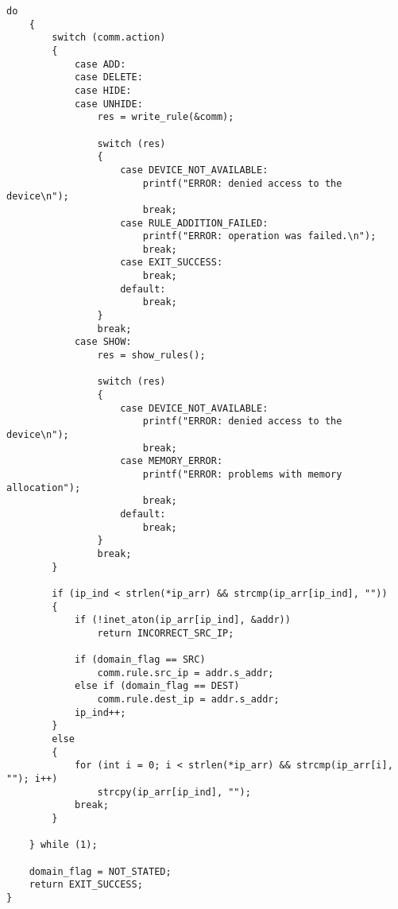 \begin{lstlisting}[caption = {fw.c}]
	do
	{	
		switch (comm.action)
		{
			case ADD:
			case DELETE:
			case HIDE:
			case UNHIDE:
				res = write_rule(&comm);
				
				switch (res)
				{
					case DEVICE_NOT_AVAILABLE:
						printf("ERROR: denied access to the device\n");
						break;
					case RULE_ADDITION_FAILED:
						printf("ERROR: operation was failed.\n");
						break;
					case EXIT_SUCCESS:
						break;
					default:
						break;
				}
				break;
			case SHOW:
				res = show_rules();
				
				switch (res)
				{
					case DEVICE_NOT_AVAILABLE:
						printf("ERROR: denied access to the device\n");
						break;
					case MEMORY_ERROR:
						printf("ERROR: problems with memory allocation");
						break;
					default:
						break;
				}
				break;
		}
		
		if (ip_ind < strlen(*ip_arr) && strcmp(ip_arr[ip_ind], ""))
		{
			if (!inet_aton(ip_arr[ip_ind], &addr))
				return INCORRECT_SRC_IP;
			
			if (domain_flag == SRC)
				comm.rule.src_ip = addr.s_addr;
			else if (domain_flag == DEST)
				comm.rule.dest_ip = addr.s_addr;
			ip_ind++;
		}
		else
		{
			for (int i = 0; i < strlen(*ip_arr) && strcmp(ip_arr[i], ""); i++)
				strcpy(ip_arr[ip_ind], "");
			break;
		}
		
	} while (1);
	
	domain_flag = NOT_STATED;
	return EXIT_SUCCESS;
}
\end{lstlisting}